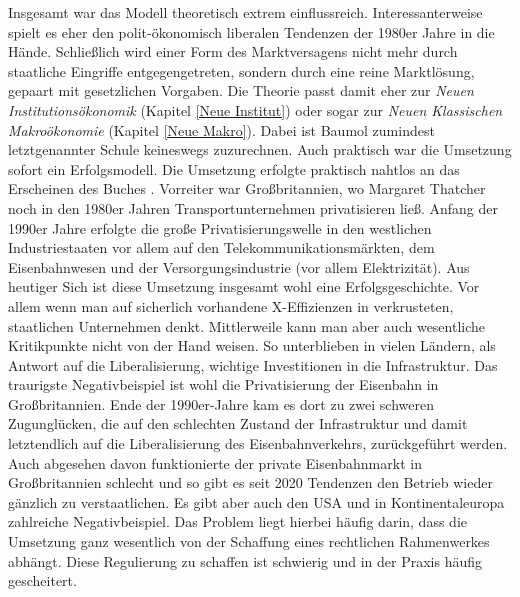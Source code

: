 Insgesamt war das Modell theoretisch extrem einflussreich. Interessanterweise spielt es eher den polit-ökonomisch liberalen Tendenzen der 1980er Jahre in die Hände. Schließlich wird einer Form des Marktversagens nicht mehr durch staatliche Eingriffe entgegengetreten, sondern durch eine reine Marktlösung, gepaart mit gesetzlichen Vorgaben. Die Theorie passt damit eher zur \textit{Neuen Institutionsökonomik} (Kapitel \ref{Neue Institut}) oder sogar zur \textit{Neuen Klassischen Makroökonomie} (Kapitel \ref{Neue Makro}). Dabei ist Baumol zumindest letztgenannter Schule keineswegs zuzurechnen. Auch praktisch war die Umsetzung sofort ein Erfolgsmodell. Die Umsetzung erfolgte praktisch nahtlos an das Erscheinen des Buches \textcite{Baumol1982}. Vorreiter war Großbritannien, wo Margaret Thatcher noch in den 1980er Jahren Transportunternehmen privatisieren ließ. Anfang der 1990er Jahre erfolgte die große Privatisierungswelle in den westlichen Industriestaaten vor allem auf den Telekommunikationsmärkten, dem Eisenbahnwesen und der Versorgungsindustrie (vor allem Elektrizität). Aus heutiger Sich ist diese Umsetzung insgesamt wohl eine Erfolgsgeschichte. Vor allem wenn man auf sicherlich vorhandene X-Effizienzen in verkrusteten, staatlichen Unternehmen denkt. Mittlerweile kann man aber auch wesentliche Kritikpunkte nicht von der Hand weisen. So unterblieben in vielen Ländern, als Antwort auf die Liberalisierung, wichtige Investitionen in die Infrastruktur. Das traurigste Negativbeispiel ist wohl die Privatisierung der Eisenbahn in Großbritannien. Ende der 1990er-Jahre kam es dort zu zwei schweren Zugunglücken, die auf den schlechten Zustand der Infrastruktur und damit letztendlich auf die Liberalisierung des Eisenbahnverkehrs, zurückgeführt werden. Auch abgesehen davon funktionierte der private Eisenbahnmarkt in Großbritannien schlecht und so gibt es seit 2020 Tendenzen den Betrieb wieder gänzlich zu verstaatlichen. Es gibt aber auch den USA und in Kontinentaleuropa zahlreiche Negativbeispiel. Das Problem liegt hierbei häufig darin, dass die Umsetzung ganz wesentlich von der Schaffung eines rechtlichen Rahmenwerkes abhängt. Diese Regulierung zu schaffen ist schwierig und in der Praxis häufig gescheitert.

